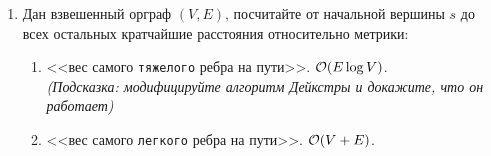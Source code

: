\begin{enumerate}
  \item
    Дан взвешенный орграф $(V, E)$, посчитайте от начальной вершины $s$ до всех остальных
    кратчайшие расстояния относительно метрики:
    \begin{enumerate}
      \item <<вес самого \texttt{тяжелого} ребра на пути>>. $\mathcal{O}(E \log{V})$. \\
        \textit{(Подсказка: модифицируйте алгоритм Дейкстры и докажите, что он работает)}
      \item <<вес самого \texttt{легкого} ребра на пути>>. $\mathcal{O}(V + E)$.
    \end{enumerate}



\end{enumerate}

